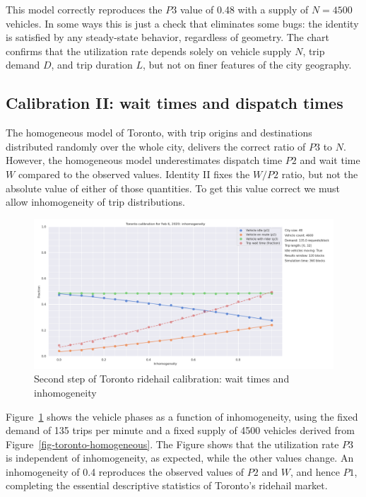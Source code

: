 \documentclass[
  letterpaper,
]{article}
\begin{document}
This model correctly reproduces the \(P3\) value of 0.48 with a supply
of \(N = 4500\) vehicles. In some ways this is just a check that
eliminates some bugs: the identity is satisfied by any steady-state
behavior, regardless of geometry. The chart confirms that the
utilization rate depends solely on vehicle supply \(N\), trip demand
\(D\), and trip duration \(L\), but not on finer features of the city
geography.

\hypertarget{calibration-ii-wait-times-and-dispatch-times}{%
\subsection{Calibration II: wait times and dispatch
times}\label{calibration-ii-wait-times-and-dispatch-times}}

The homogeneous model of Toronto, with trip origins and destinations
distributed randomly over the whole city, delivers the correct ratio of
\(P3\) to \(N\). However, the homogeneous model underestimates dispatch
time \(P2\) and wait time \(W\) compared to the observed values.
Identity II fixes the \(W/P2\) ratio, but not the absolute value of
either of those quantities. To get this value correct we must allow
inhomogeneity of trip distributions.

\begin{figure}

{\centering \includegraphics{toronto_calibration_inhomogeneous.png}

}

\caption{\label{fig-inhomog}Second step of Toronto ridehail calibration:
wait times and inhomogeneity}

\end{figure}

Figure~\ref{fig-inhomog} shows the vehicle phases as a function of
inhomogeneity, using the fixed demand of 135 trips per minute and a
fixed supply of 4500 vehicles derived from
Figure~\ref{fig-toronto-homogeneous}. The Figure shows that the
utilization rate \(P3\) is independent of inhomogeneity, as expected,
while the other values change. An inhomogeneity of 0.4 reproduces the
observed values of \(P2\) and \(W\), and hence \(P1\), completing the
essential descriptive statistics of Toronto's ridehail market.
\end{document}
